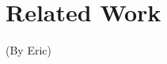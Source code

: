 \documentclass[journal]{IEEEtran}
\begin{document}
\section{Related Work}
(By Eric)

%
%



%
%
\end{document}
